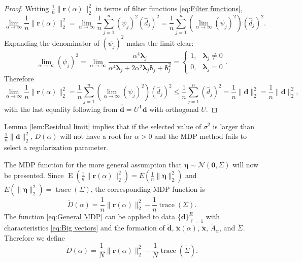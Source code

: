 \documentclass[12pt]{article}
\newcommand{\dVec}{\mathbf{d}}	%
\newcommand{\rVec}{\mathbf{r}}	%
\newcommand{\xVec}{\mathbf{x}}	%
\newcommand{\trans}[1]{{#1}^\mathsf{T}}	%
\DeclareMathOperator{\trace}{trace}		%
\newcommand{\dft}[1]{\widehat{#1}}	%
\newcommand{\regparam}{\alpha}
\newcommand{\mfilt}{\psi}
\newcommand{\noise}{\eta}	%
\newcommand{\noiseSD}{\sigma}	%
\newcommand{\noiseVec}{\bm{\noise}}	%
\DeclareMathOperator{\E}{E}	%
\newcommand{\zeroVec}{\bm{0}}	%
\newcommand{\svd}[1]{\widehat{#1}}	%
\newcommand{\D}{D}	%
\begin{document}
\begin{proof}
Writing $\frac{1}{n}\|\rVec(\regparam)\|_2^2$ in terms of filter functions \eqref{eq:Filter functions},
\[\lim_{\regparam\rightarrow\infty} \frac{1}{n}\|\rVec(\regparam)\|_2^2 = \lim_{\regparam\rightarrow\infty} \frac{1}{n} \sum_{j=1}^{n} \left(\mfilt_j\right)^2\left(\dft{d}_j\right)^2 = \frac{1}{n} \sum_{j=1}^{n} \left(\lim_{\regparam\rightarrow\infty}\left(\mfilt_j\right)^2\right)\left(\dft{d}_j\right)^2.\]
Expanding the denominator of $\left(\mfilt_j\right)^2$ makes the limit clear:
\[\lim_{\regparam\rightarrow\infty} \left(\mfilt_j\right)^2 = \lim_{\regparam\rightarrow\infty}\frac{\regparam^4\bm{\lambda}_j}{\regparam^4\bm{\lambda}_j + 2\regparam^2\bm{\lambda}_j\bm{\delta}_j + \bm{\delta}_j^2} = \begin{cases}
1, & \bm{\lambda}_j \neq 0 \\
0, & \bm{\lambda}_j = 0
\end{cases}.\]
Therefore
\[\lim_{\regparam\rightarrow\infty} \frac{1}{n}\|\rVec(\regparam)\|_2^2 = \frac{1}{n} \sum_{j=1}^{n} \left(\lim_{\regparam\rightarrow\infty}\left(\mfilt_j\right)^2\right)\left(\dft{d}_j\right)^2 \leq \frac{1}{n} \sum_{j=1}^{n} \left(\dft{d}_j\right)^2 = \frac{1}{n}\|\svd{\dVec}\|_2^2 = \frac{1}{n}\|\dVec\|_2^2,\]
with the last equality following from $\svd{\dVec} = \trans{U}\dVec$ with orthogonal $U$.
\end{proof}
\noindent Lemma \ref{lem:Residual limit} implies that if the selected value of $\noiseSD^2$ is larger than $\frac{1}{n}\|\dVec\|_2^2$, $\D(\regparam)$ will not have a root for $\regparam > 0$ and the MDP method fails to select a regularization parameter. \par
The MDP function for the more general assumption that $\noiseVec \sim \mathcal{N}(\zeroVec,\Sigma)$ will now be presented. Since $\E(\frac{1}{n}\|\rVec(\regparam)\|_2^2) = E(\frac{1}{n}\|\noiseVec\|_2^2)$ and $E(\|\noiseVec\|_2^2) = \trace(\Sigma)$, the corresponding MDP function is
\begin{equation}
\label{eq:General MDP}
\widetilde{\D}(\regparam) = \frac{1}{n}\|\rVec(\regparam)\|_2^2 - \frac{1}{n}\trace\left(\Sigma\right).
\end{equation}
The function \eqref{eq:General MDP} can be applied to data $\{\dVec\}_{\ell=1}^R$ with characteristics \eqref{eq:Big vectors} and the formation of $\widetilde{\dVec}$, $\widetilde{\xVec}(\regparam)$, $\widetilde{\xVec}$, $\widetilde{A}_{\regparam}$, and $\widetilde{\Sigma}$. Therefore we define
\begin{equation}
\label{eq:Big MDP}
\widetilde{\D}(\regparam) = \frac{1}{N}\|\widetilde{\rVec}(\regparam)\|_2^2 - \frac{1}{N}\trace\left(\widetilde{\Sigma}\right).
\end{equation}
\end{document}
